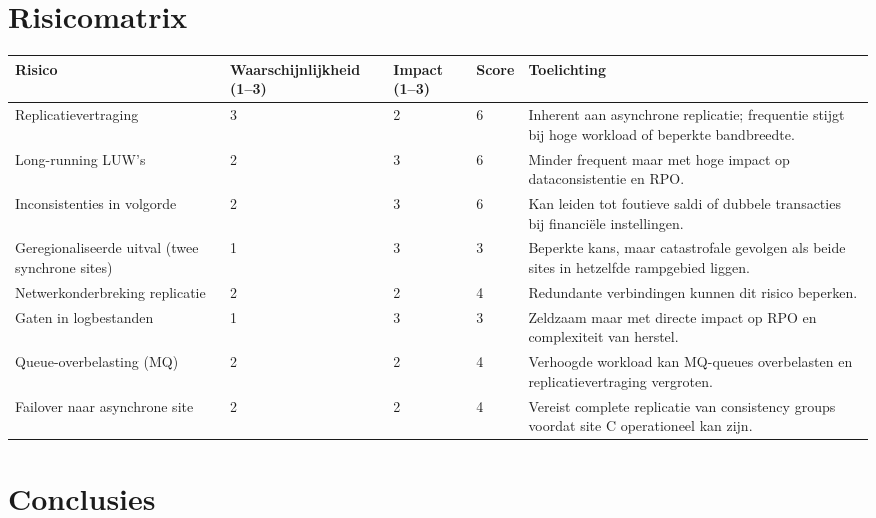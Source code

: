 \documentclass[a0,portrait]{hogent-poster}
\begin{document}
\begin{multicols}{2}
\section{Risicomatrix}

\small
\begin{tabularx}{\columnwidth}{|
  >{\raggedright\arraybackslash}p{6.5cm} | %
  p{3cm} | %
  p{3cm} | %
  p{2cm} | %
  >{\raggedright\arraybackslash}X | %
}
\hline
\textbf{Risico} & \textbf{Waar\-schijn\-lijk\-heid (1--3)} & \textbf{Impact (1--3)} & \textbf{Score} & \textbf{Toelichting} \\
\hline
Replicatie\-vertraging & 3 & 2 & 6 & Inherent aan asynchrone replicatie; frequentie stijgt bij hoge workload of beperkte bandbreedte. \\
\hline
Long-running LUW's & 2 & 3 & 6 & Minder frequent maar met hoge impact op dataconsistentie en RPO. \\
\hline
Inconsistenties in volgorde & 2 & 3 & 6 & Kan leiden tot foutieve saldi of dubbele transacties bij financiële instellingen. \\
\hline
Geregionaliseerde uitval (twee synchrone sites) & 1 & 3 & 3 & Beperkte kans, maar catastrofale gevolgen als beide sites in hetzelfde rampgebied liggen. \\
\hline
Netwerk\-onderbreking replicatie & 2 & 2 & 4 & Redundante verbindingen kunnen dit risico beperken. \\
\hline
Gaten in logbestanden & 1 & 3 & 3 & Zeldzaam maar met directe impact op RPO en complexiteit van herstel. \\
\hline
Queue-overbelasting (MQ) & 2 & 2 & 4 & Verhoogde workload kan MQ-queues overbelasten en replicatievertraging vergroten. \\
\hline
Failover naar asynchrone site & 2 & 2 & 4 & Vereist complete replicatie van consistency groups voordat site C operationeel kan zijn. \\
\hline
\end{tabularx}

\section{Conclusies}


\end{multicols}
\end{document}
